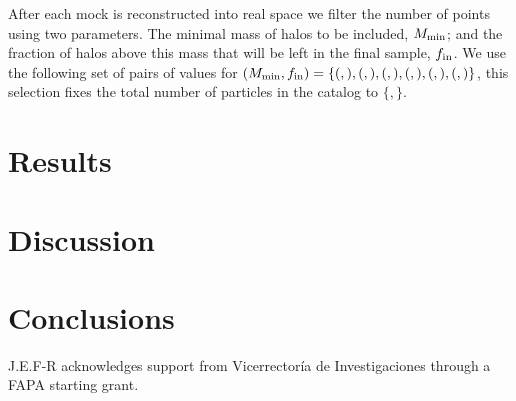 \documentclass{emulateapj}
\begin{document}
After each mock is reconstructed into real space we filter the number
of points using two parameters. The minimal mass of halos to be
included, $M_{\rm min}$; and the fraction of halos above this mass
that will be left in the final sample, $f_{\rm in}$. We use the
following set of pairs of values for $(M_{\rm min}, f_{\rm in})=\{(,),(,),(,),(,),(,),(,)\}$, this selection fixes the total number of particles in the catalog
to $\{,\}$. 

 





\section{Results}
\label{sec:results}

\section{Discussion}
\label{sec:discussion}

\section{Conclusions}
\label{sec:conclusions}



J.E.F-R acknowledges support from Vicerrector\'ia de
Investigaciones through a FAPA starting grant.


 
\end{document}
